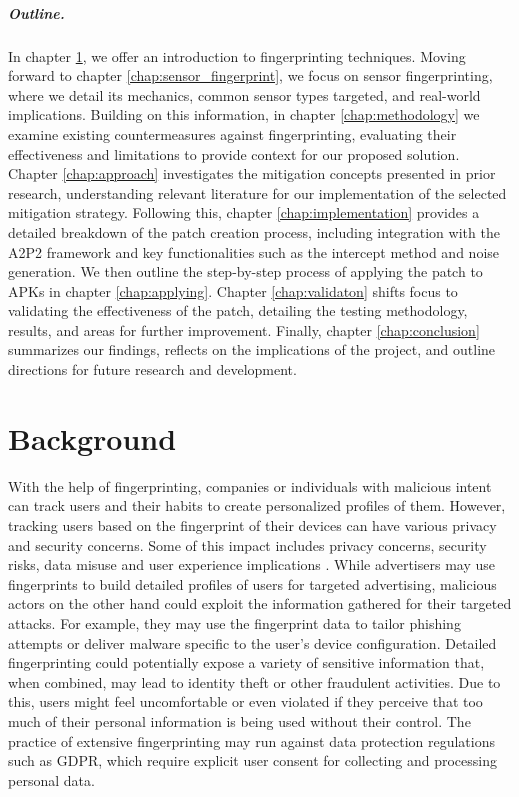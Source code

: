 \documentclass[11pt,
  oneside,openany,    %
]{scrreprt}
\begin{document}
\paragraph{Outline.}
In chapter \ref{chap:background}, we offer an introduction to fingerprinting techniques. 
Moving forward to chapter \ref{chap:sensor_fingerprint}, we focus on sensor fingerprinting, where we detail its mechanics, common sensor types targeted, and real-world implications.
Building on this information, in chapter \ref{chap:methodology} we examine existing countermeasures against fingerprinting, evaluating their effectiveness and limitations to provide context for our proposed solution. 
Chapter \ref{chap:approach} investigates the mitigation concepts presented in prior research, understanding relevant literature for our implementation of the selected mitigation strategy.
Following this, chapter \ref{chap:implementation} provides a detailed breakdown of the patch creation process, including integration with the A2P2 framework and key functionalities such as the intercept method and noise generation. 
We then outline the step-by-step process of applying the patch to APKs in chapter \ref{chap:applying}. 
Chapter \ref{chap:validaton} shifts focus to validating the effectiveness of the patch, detailing the testing methodology, results, and areas for further improvement. 
Finally, chapter \ref{chap:conclusion} summarizes our findings, reflects on the implications of the project, and outline directions for future research and development.


\chapter{Background}
\label{chap:background}
With the help of fingerprinting, companies or individuals with malicious intent can track users and their habits to create personalized profiles of them.
However, tracking users based on the fingerprint of their devices can have various privacy and security concerns. 
Some of this impact includes privacy concerns, security risks, data misuse and user experience implications \cite{DBLP:conf/ndss/MengZXZZBLTD23}.
While advertisers may use fingerprints to build detailed profiles of users for targeted advertising, malicious actors on the other hand could exploit the information gathered for their targeted attacks. 
For example, they may use the fingerprint data to tailor phishing attempts or deliver malware specific to the user's device configuration.
Detailed fingerprinting could potentially expose a variety of sensitive information that, when combined, may lead to identity theft or other fraudulent activities.
Due to this, users might feel uncomfortable or even violated if they perceive that too much of their personal information is being used without their control.
The practice of extensive fingerprinting may run against data protection regulations such as GDPR, which require explicit user consent for collecting and processing personal data.
\end{document}
